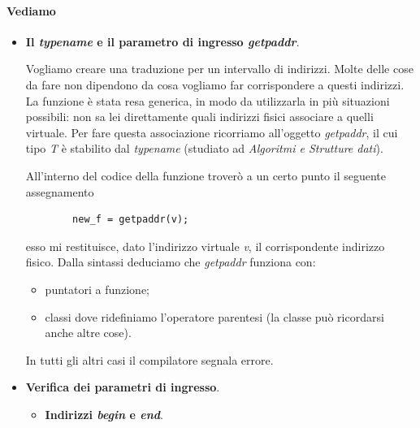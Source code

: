 \documentclass[11pt]{report}
\theoremstyle{definition}
\begin{document}
\paragraph{Vediamo}
\begin{itemize}
	\item \textbf{Il \emph{typename} e il parametro di ingresso \emph{getpaddr}}.
	
	Vogliamo creare una traduzione per un intervallo di indirizzi. Molte delle cose da fare non dipendono da cosa vogliamo far corrispondere a questi indirizzi. La funzione è stata resa generica, in modo da utilizzarla in più situazioni possibili: non sa lei direttamente quali indirizzi fisici associare a quelli virtuale. Per fare questa associazione ricorriamo all'oggetto \emph{getpaddr}, il cui tipo \emph{T} è stabilito dal \emph{typename} (studiato ad \emph{Algoritmi e Strutture dati}).
	
	All'interno del codice della funzione troverò a un certo punto il seguente assegnamento
	\begin{verbatim}
		new_f = getpaddr(v);
	\end{verbatim}
	esso mi restituisce, dato l'indirizzo virtuale \emph{v}, il corrispondente indirizzo fisico. Dalla sintassi deduciamo che \emph{getpaddr} funziona con:
	\begin{itemize}
		\item puntatori a funzione;
		\item classi dove ridefiniamo l'operatore parentesi (la classe può ricordarsi anche altre cose).
	\end{itemize}
	In tutti gli altri casi il compilatore segnala errore.
	\item \textbf{Verifica dei parametri di ingresso}.
	\begin{itemize}
		\item \textbf{Indirizzi \emph{begin} e \emph{end}}. 
		

\end{itemize}
\end{itemize}
\end{document}
